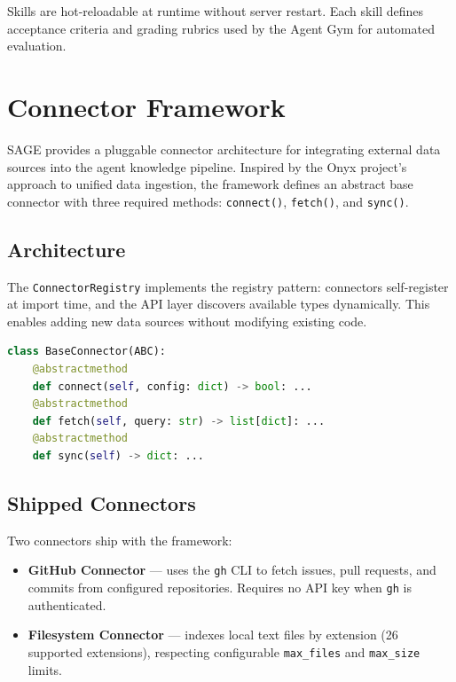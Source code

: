 \documentclass[11pt,a4paper]{article}
\begin{document}
Skills are hot-reloadable at runtime without server restart. Each skill defines acceptance criteria and grading rubrics used by the Agent Gym for automated evaluation.

\section{Connector Framework}
\label{sec:connectors}

SAGE provides a pluggable connector architecture for integrating external data sources into the agent knowledge pipeline. Inspired by the Onyx project's approach to unified data ingestion, the framework defines an abstract base connector with three required methods: \texttt{connect()}, \texttt{fetch()}, and \texttt{sync()}.

\subsection{Architecture}

The \texttt{ConnectorRegistry} implements the registry pattern: connectors self-register at import time, and the API layer discovers available types dynamically. This enables adding new data sources without modifying existing code.

\begin{lstlisting}[language=Python, caption={BaseConnector abstract interface.}]
class BaseConnector(ABC):
    @abstractmethod
    def connect(self, config: dict) -> bool: ...
    @abstractmethod
    def fetch(self, query: str) -> list[dict]: ...
    @abstractmethod
    def sync(self) -> dict: ...
\end{lstlisting}

\subsection{Shipped Connectors}

Two connectors ship with the framework:

\begin{itemize}[noitemsep]
    \item \textbf{GitHub Connector} --- uses the \texttt{gh} CLI to fetch issues, pull requests, and commits from configured repositories. Requires no API key when \texttt{gh} is authenticated.
    \item \textbf{Filesystem Connector} --- indexes local text files by extension (26 supported extensions), respecting configurable \texttt{max\_files} and \texttt{max\_size} limits.
\end{itemize}
\end{document}
